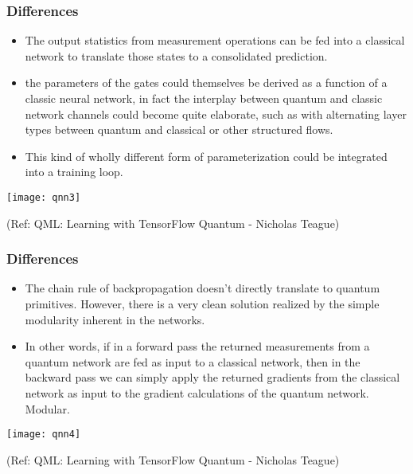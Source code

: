  \begin{frame}[fragile]\frametitle{Differences}
 
\begin{itemize}
\item   The output statistics from measurement operations can be fed
into a classical network to translate those states to a consolidated prediction.
\item  the parameters of the gates could themselves be derived as a function of a classic neural network, in fact the interplay between quantum and classic network
channels could become quite elaborate, such as with alternating layer types between
quantum and classical or other structured flows.
\item  This kind of wholly different form of
parameterization could be integrated into a training loop. 
\end{itemize}

\begin{center}
\texttt{[image: qnn3]}
\end{center}
	

\tiny{(Ref: QML: Learning with TensorFlow Quantum - Nicholas Teague)}

\end{frame}

 \begin{frame}[fragile]\frametitle{Differences}
 
\begin{itemize}
\item  The chain rule of backpropagation doesn’t directly translate to quantum primitives.
However, there is a very clean solution realized by the simple modularity inherent in the
networks.
\item In other words, if in a forward pass the returned measurements from a
quantum network are fed as input to a classical network, then in the backward pass we
can simply apply the returned gradients from the classical network as input to the
gradient calculations of the quantum network. Modular. 
\end{itemize}

\begin{center}
\texttt{[image: qnn4]}
\end{center}
	

\tiny{(Ref: QML: Learning with TensorFlow Quantum - Nicholas Teague)}

\end{frame}

